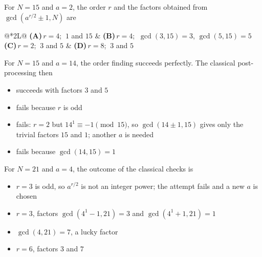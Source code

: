 \documentclass[11pt,a4paper]{article}
\newcommand{\optlabel}[1]{\textbf{(#1)}}
\newenvironment{qitem}[1]{\begin{list}{}{\setlength{\leftmargin}{3.3em}\setlength{\labelwidth}{3.1em}%
  \setlength{\labelsep}{0.2em}\setlength{\topsep}{3pt}\setlength{\parsep}{3pt}}\item[\textbf{Q.#1}\hfill]}{\end{list}}
\newcommand{\qsep}{\par\vspace{2pt}{\color{black!15}\hrule}\vspace{4pt}}
\begin{document}
\begin{qitem}{42}
For $N = 15$ and $a = 2$, the order $r$ and the factors obtained from $\gcd(a^{r/2} \pm 1, N)$ are
\par\smallskip\noindent\begin{tabularx}{\linewidth}{@{}*{2}{L}@{}}
\optlabel{A}\,$r = 4$; $\ 1$ and $15$ & \optlabel{B}\,$r = 4$; $\ \gcd(3, 15) = 3$, $\gcd(5, 15) = 5$ \\[3pt]
\optlabel{C}\,$r = 2$; $\ 3$ and $5$ & \optlabel{D}\,$r = 8$; $\ 3$ and $5$
\end{tabularx}
\end{qitem}
\qsep

\begin{qitem}{43}
For $N = 15$ and $a = 14$, the order finding succeeds perfectly. The classical post-processing then
\begin{itemize}[leftmargin=2.6em, labelsep=0.4em, itemsep=2pt, topsep=3pt]
\item[\optlabel{A}] succeeds with factors $3$ and $5$
\item[\optlabel{B}] fails because $r$ is odd
\item[\optlabel{C}] fails: $r = 2$ but $14^{1} \equiv -1 \pmod{15}$, so $\gcd(14 \pm 1, 15)$ gives only the trivial factors $15$ and $1$; another $a$ is needed
\item[\optlabel{D}] fails because $\gcd(14, 15) = 1$
\end{itemize}
\end{qitem}
\qsep

\begin{qitem}{44}
For $N = 21$ and $a = 4$, the outcome of the classical checks is
\begin{itemize}[leftmargin=2.6em, labelsep=0.4em, itemsep=2pt, topsep=3pt]
\item[\optlabel{A}] $r = 3$ is odd, so $a^{r/2}$ is not an integer power; the attempt fails and a new $a$ is chosen
\item[\optlabel{B}] $r = 3$, factors $\gcd(4^1 - 1, 21) = 3$ and $\gcd(4^1 + 1, 21) = 1$
\item[\optlabel{C}] $\gcd(4, 21) = 7$, a lucky factor
\item[\optlabel{D}] $r = 6$, factors $3$ and $7$
\end{itemize}
\end{qitem}
\qsep
\end{document}
